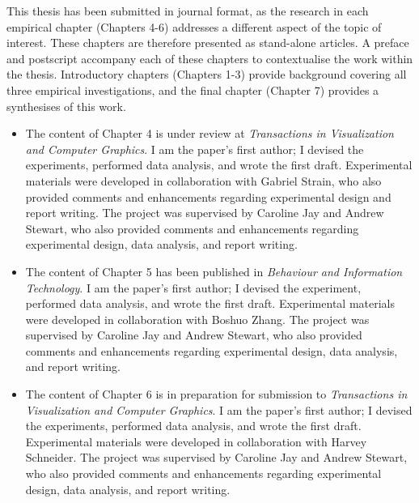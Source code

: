 This thesis has been submitted in journal format, as the research in each empirical chapter (Chapters 4-6) addresses a different aspect of the topic of interest. These chapters are therefore presented as stand-alone articles. A preface and postscript accompany each of these chapters to contextualise the work within the thesis. Introductory chapters (Chapters 1-3) provide background covering all three empirical investigations, and the final chapter (Chapter 7) provides a synthesises of this work.

\begin{itemize} 
\item The content of Chapter 4 is under review at \textit{Transactions in Visualization and Computer Graphics}. I am the paper’s first author; I devised the experiments, performed data analysis, and wrote the first draft. Experimental materials were developed in collaboration with Gabriel Strain, who also provided comments and enhancements regarding experimental design and report writing. The project was supervised by Caroline Jay and Andrew Stewart, who also provided comments and enhancements regarding experimental design, data analysis, and report writing.
\item The content of Chapter 5 has been published in \textit{Behaviour and Information Technology}. I am the paper’s first author; I devised the experiment, performed data analysis, and wrote the first draft. Experimental materials were developed in collaboration with Boshuo Zhang. The project was supervised by Caroline Jay and Andrew Stewart, who also provided comments and enhancements regarding experimental design, data analysis, and report writing.
\item The content of Chapter 6 is in preparation for submission to \textit{Transactions in Visualization and Computer Graphics}. I am the paper’s first author; I devised the experiments, performed data analysis, and wrote the first draft. Experimental materials were developed in collaboration with Harvey Schneider. The project was supervised by Caroline Jay and Andrew Stewart, who also provided comments and enhancements regarding experimental design, data analysis, and report writing.\\
\end{itemize} 